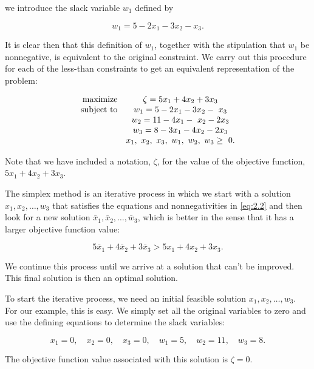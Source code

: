 \documentclass{article}
\begin{document}
    we introduce the slack variable \( w_{1} \) defined by
    
    \[ w_{1}=5-2x_{1}-3x_{2}-x_{3}. \]
    
    It is clear then that this definition of \( w_{1} \), together with the stipulation that \( w_{1} \) be nonnegative, is equivalent to the original constraint. We carry out this procedure for each of the less-than constraints to get an equivalent representation of the problem:
    
    \begin{equation}\label{eq:2.2}
    \begin{array}[]{rcl}
    \text{maximize} & \zeta= 5x_{1}+4x_{2}+3x_{3} \\
    \text{subject to} & w_{1}= 5-2x_{1}-3x_{2}-\ x_{3} \\
    & w_{2}=11-4x_{1}-\ x_{2}-2x_{3} \\
    & w_{3}= 8-3x_{1}-4x_{2}-2x_{3} \\
    & x_{1},\ x_{2},\ x_{3},\ w_{1},\ w_{2},\ w_{3}\geq\ 0.
    \end{array}
    \end{equation}
    
    Note that we have included a notation, \( \zeta \), for the value of the objective function, \( 5x_{1}+4x_{2}+3x_{3} \).
    
    The simplex method is an iterative process in which we start with a solution \( x_{1},x_{2},\ldots,w_{3} \) that satisfies the equations and nonnegativities in \eqref{eq:2.2} and then look for a new solution \( \bar{x}_{1},\bar{x}_{2},\ldots,\bar{w}_{3} \), which is better in the sense that it has a larger objective function value:
    
    \[ 5\bar{x}_{1}+4\bar{x}_{2}+3\bar{x}_{3}>5x_{1}+4x_{2}+3x_{3}. \]
    
    We continue this process until we arrive at a solution that can't be improved. This final solution is then an optimal solution.
    
    To start the iterative process, we need an initial feasible solution \( x_{1},x_{2},\ldots,w_{3} \). For our example, this is easy. We simply set all the original variables to zero and use the defining equations to determine the slack variables:
    
    \[ x_{1}=0,\quad x_{2}=0,\quad x_{3}=0,\quad w_{1}=5,\quad w_{2}=11,\quad w_{3}=8. \]
    
    The objective function value associated with this solution is \( \zeta=0 \).
    
\end{document}
